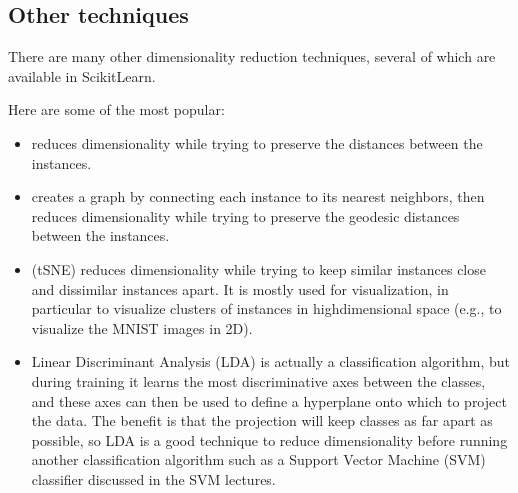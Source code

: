 \documentclass[letterpaper,10pt,english]{sphinxmanual}
\begin{document}
\subsection{Other techniques}
\label{\detokenize{chapter8:other-techniques}}
There are many other dimensionality reduction techniques, several of which are available in Scikit\sphinxhyphen{}Learn.

Here are some of the most popular:
\begin{itemize}
\item {} 
 reduces dimensionality while trying to preserve the distances between the instances.

\item {} 
 creates a graph by connecting each instance to its nearest neighbors, then reduces dimensionality while trying to preserve the geodesic distances between the instances.

\item {} 
 (t\sphinxhyphen{}SNE) reduces dimensionality while trying to keep similar instances close and dissimilar instances apart. It is mostly used for visualization, in particular to visualize clusters of instances in high\sphinxhyphen{}dimensional space (e.g., to visualize the MNIST images in 2D).

\item {} 
Linear Discriminant Analysis (LDA) is actually a classification algorithm, but during training it learns the most discriminative axes between the classes, and these axes can then be used to define a hyperplane onto which to project the data. The benefit is that the projection will keep classes as far apart as possible, so LDA is a good technique to reduce dimensionality before running another classification algorithm such as a Support Vector Machine (SVM) classifier discussed in the SVM lectures.

\end{itemize}







\renewcommand{\indexname}{Index}
\printindex
\end{document}
